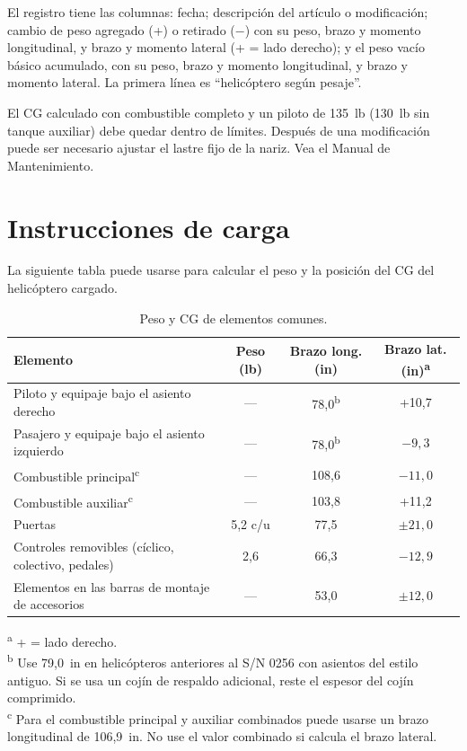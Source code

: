 El registro tiene las columnas: fecha; descripción del artículo o modificación; cambio de peso agregado (+) o retirado ($-$) con su peso, brazo y momento longitudinal, y brazo y momento lateral (+ = lado derecho); y el peso vacío básico acumulado, con su peso, brazo y momento longitudinal, y brazo y momento lateral. La primera línea es ``helicóptero según pesaje''.

\begin{nota}
El CG calculado con combustible completo y un piloto de 135~lb (130~lb sin tanque auxiliar) debe quedar dentro de límites. Después de una modificación puede ser necesario ajustar el lastre fijo de la nariz. Vea el Manual de Mantenimiento.
\end{nota}

\section{Instrucciones de carga}

La siguiente tabla puede usarse para calcular el peso y la posición del CG del helicóptero cargado.

\begin{table}[htbp]
\centering\small
\caption{Peso y CG de elementos comunes.}
\label{tab:items-comunes}
\begin{tabularx}{\linewidth}{@{}Yccc@{}}
\toprule
Elemento & Peso (lb) & Brazo long. (in) & Brazo lat. (in)\textsuperscript{a} \\
\midrule
Piloto y equipaje bajo el asiento derecho & --- & 78,0\textsuperscript{b} & +10,7 \\
Pasajero y equipaje bajo el asiento izquierdo & --- & 78,0\textsuperscript{b} & $-9,3$ \\
Combustible principal\textsuperscript{c} & --- & 108,6 & $-11,0$ \\
Combustible auxiliar\textsuperscript{c} & --- & 103,8 & +11,2 \\
Puertas & 5,2 c/u & 77,5 & $\pm 21,0$ \\
Controles removibles (cíclico, colectivo, pedales) & 2,6 & 66,3 & $-12,9$ \\
Elementos en las barras de montaje de accesorios & --- & 53,0 & $\pm 12,0$ \\
\bottomrule
\end{tabularx}

\smallskip
\begin{minipage}{.94\linewidth}\footnotesize
\textsuperscript{a} + = lado derecho.\\
\textsuperscript{b} Use 79,0~in en helicópteros anteriores al S/N 0256 con asientos del estilo antiguo. Si se usa un cojín de respaldo adicional, reste el espesor del cojín comprimido.\\
\textsuperscript{c} Para el combustible principal y auxiliar combinados puede usarse un brazo longitudinal de 106,9~in. No use el valor combinado si calcula el brazo lateral.
\end{minipage}
\end{table}


